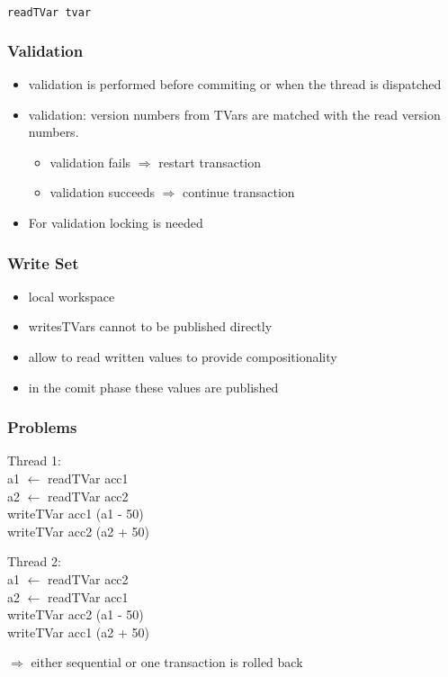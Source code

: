 \documentclass{beamer}
\begin{document}
  \begin{frame}
   \begin{lstlisting}[language=Haskell]
    readTVar tvar
   \end{lstlisting}

  \end{frame}

  \begin{frame}
   \frametitle{Validation}
    \begin{itemize}\setlength\itemsep{1em}
      \item validation is performed before commiting or when the thread is dispatched
      \item validation: version numbers from TVars are matched with the read version numbers.
      \begin{itemize}
	\item validation fails $\Rightarrow$ restart transaction
	\item validation succeeds $\Rightarrow$ continue transaction
      \end{itemize}
      \item For validation locking is needed
    \end{itemize}
  \end{frame}

  \begin{frame}
   \frametitle{Write Set}
   \begin{itemize}
    \item local workspace
    \item writesTVars cannot to be published directly
    \item allow to read written values to provide compositionality
    \item in the comit phase these values are published
   \end{itemize}
  \end{frame}

    \begin{frame}
    \frametitle{Problems}
    \fboxsep=0pt
    \noindent
    \begin{minipage}[t]{0.48\linewidth}
      Thread 1: \\
       a1 $\leftarrow$ readTVar acc1\\
       a2 $\leftarrow$ readTVar acc2\\
       writeTVar acc1 (a1 - 50)\\
       writeTVar acc2 (a2 + 50)\\
    \end{minipage}%
    \hfill%
    \begin{minipage}[t]{0.48\linewidth}
      Thread 2:\\
       a1 $\leftarrow$ readTVar acc2\\
       a2 $\leftarrow$ readTVar acc1\\
       writeTVar acc2 (a1 - 50)\\
       writeTVar acc1 (a2 + 50)\\
    \end{minipage}
    \vfill
    \pause
    $\Rightarrow$ either sequential or one transaction is rolled back
  \end{frame}
  
\end{document}
